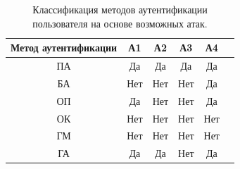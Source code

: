 \begin{table}[h]
    \begin{center}
    \begin{threeparttable}          \captionsetup{justification=raggedright,singlelinecheck=off}
        \caption{\label{tabular:res2} Классификация методов аутентификации пользователя на основе возможных атак.}
        \begin{tabular}{|c|c|c|c|c|c|}
            \hline
            \bfseries Метод аутентификации & \bfseries А1 & \bfseries А2 & \bfseries А3 & \bfseries А4 \\
            \hline
            ПА & Да & Да & Да & Да \\ \hline
            БА & Нет & Нет & Нет & Да  \\ \hline
            ОП & Да & Нет & Нет & Да \\ \hline
            ОК & Нет & Нет & Нет & Нет\\ \hline
            ГМ & Нет & Нет & Нет & Нет \\ \hline
            ГА & Да & Да & Нет & Да \\ \hline
        \end{tabular}
    \end{threeparttable}
    \end{center}
\end{table}



